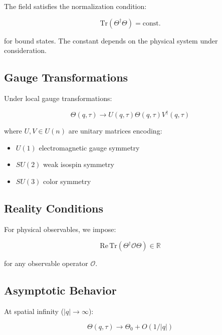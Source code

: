 The field satisfies the normalization condition:

\begin{equation}
\label{eq:canonical:theta_normalization}
\text{Tr}(\Theta^\dagger \Theta) = \text{const.}
\end{equation}

for bound states. The constant depends on the physical system under consideration.

\subsection{Gauge Transformations}

Under local gauge transformations:

\begin{equation}
\label{eq:canonical:theta_gauge}
\Theta(q,\tau) \to U(q,\tau) \Theta(q,\tau) V^\dagger(q,\tau)
\end{equation}

\noindent where $U,V \in U(n)$ are unitary matrices encoding:
\begin{itemize}
    \item $U(1)$ electromagnetic gauge symmetry
    \item $SU(2)$ weak isospin symmetry
    \item $SU(3)$ color symmetry
\end{itemize}

\subsection{Reality Conditions}

For physical observables, we impose:

\begin{equation}
\label{eq:canonical:theta_reality}
\text{Re}\,\text{Tr}(\Theta^\dagger \mathcal{O} \Theta) \in \mathbb{R}
\end{equation}

for any observable operator $\mathcal{O}$.

\subsection{Asymptotic Behavior}

At spatial infinity ($|q| \to \infty$):

\begin{equation}
\label{eq:canonical:theta_asymptotics}
\Theta(q,\tau) \to \Theta_0 + O(1/|q|)
\end{equation}

